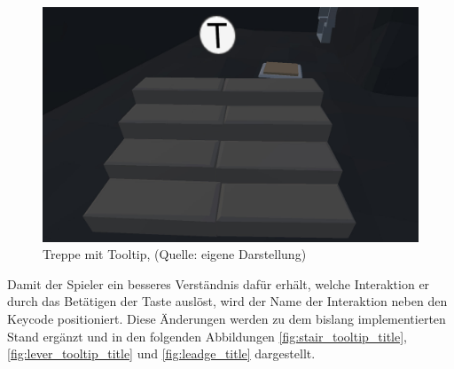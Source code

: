 \begin{figure}[ht]
\centering
\includegraphics[width=0.8\linewidth]{content/pictures/carry_tooltip.jpg}
\caption{Treppe mit Tooltip, (Quelle: eigene Darstellung)}
\label{fig:stair_tooltip}
\end{figure}
\newpage
Damit der Spieler ein besseres Verständnis dafür erhält, welche Interaktion er durch das Betätigen der Taste auslöst, wird der Name der Interaktion neben den Keycode positioniert. Diese Änderungen werden zu dem bislang implementierten Stand ergänzt und in den folgenden Abbildungen \ref{fig:stair_tooltip_title}, \ref{fig:lever_tooltip_title} und \ref{fig:leadge_title} dargestellt.

